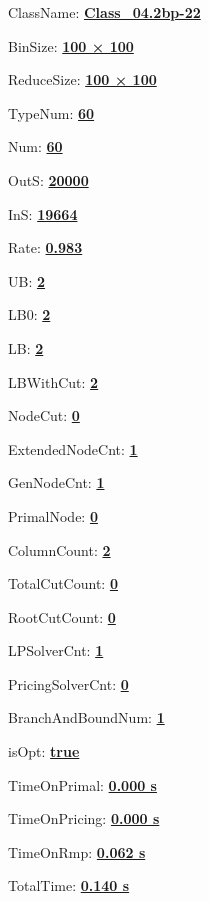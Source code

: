\documentclass[11pt]{article}
\begin{document}
\pagestyle{empty}


ClassName: \underline{\textbf{Class_04.2bp-22}}
\par
BinSize: \underline{\textbf{100 × 100}}
\par
ReduceSize: \underline{\textbf{100 × 100}}
\par
TypeNum: \underline{\textbf{60}}
\par
Num: \underline{\textbf{60}}
\par
OutS: \underline{\textbf{20000}}
\par
InS: \underline{\textbf{19664}}
\par
Rate: \underline{\textbf{0.983}}
\par
UB: \underline{\textbf{2}}
\par
LB0: \underline{\textbf{2}}
\par
LB: \underline{\textbf{2}}
\par
LBWithCut: \underline{\textbf{2}}
\par
NodeCut: \underline{\textbf{0}}
\par
ExtendedNodeCnt: \underline{\textbf{1}}
\par
GenNodeCnt: \underline{\textbf{1}}
\par
PrimalNode: \underline{\textbf{0}}
\par
ColumnCount: \underline{\textbf{2}}
\par
TotalCutCount: \underline{\textbf{0}}
\par
RootCutCount: \underline{\textbf{0}}
\par
LPSolverCnt: \underline{\textbf{1}}
\par
PricingSolverCnt: \underline{\textbf{0}}
\par
BranchAndBoundNum: \underline{\textbf{1}}
\par
isOpt: \underline{\textbf{true}}
\par
TimeOnPrimal: \underline{\textbf{0.000 s}}
\par
TimeOnPricing: \underline{\textbf{0.000 s}}
\par
TimeOnRmp: \underline{\textbf{0.062 s}}
\par
TotalTime: \underline{\textbf{0.140 s}}
\par
\newpage
\end{document}
